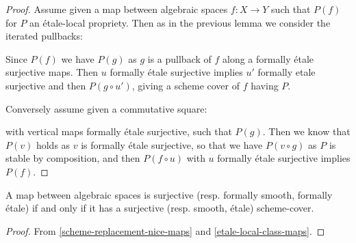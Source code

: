 \begin{proof}
Assume given a map between algebraic spaces $f:X\to Y$ such that $P(f)$ for $P$ an étale-local propriety. Then as in the previous lemma we consider the iterated pullbacks:
  \begin{center}
  \end{center}
  Since $P(f)$ we have $P(g)$ as $g$ is a pullback of $f$ along a formally étale surjective maps. Then $u$ formally étale surjective implies $u'$ formally etale surjective and then $P(g\circ u')$, giving a scheme cover of $f$ having $P$.
  
  Conversely assume given a commutative square:
  \begin{center}
  \end{center}
  with vertical maps formally étale surjective, such that $P(g)$. Then we know that $P(v)$ holds as $v$ is formally étale surjective, so that we have $P(v\circ g)$ as $P$ is stable by composition, and then $P(f\circ u)$ with $u$ formally étale surjective implies $P(f)$.
\end{proof}

\begin{corollary}
A map between algebraic spaces is surjective (resp. formally smooth, formally étale) if and only if it has a surjective (resp. smooth, étale) scheme-cover.
\end{corollary}

\begin{proof}
From \cref{scheme-replacement-nice-maps} and \cref{etale-local-class-maps}.
\end{proof}